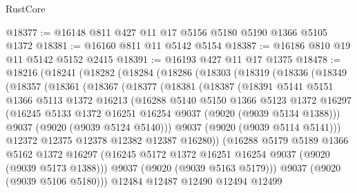 \begin{lexlean}{RustCore}
\begin{coremodule}
@18377 := @16148 @811 @427 @11 @17 @5156 @5180 @5190 @1366 @5105 @1372
@18381 := @16160 @811 @11 @5142 @5154
@18387 := @16186 @810 @19 @11 @5142 @5152 @2415
@18391 := @16193 @427 @11 @17 @1375
@18478 := @18216
    (@18241
      (@18282
        (@18284
          (@18286
            (@18303
              (@18319
                (@18336
                  (@18349
                    (@18357
                      (@18361
                        (@18367
                          (@18377
                            (@18381
                              (@18387
                                (@18391
                                  @5141
                                  @5151
                                  @1366
                                  @5113
                                  @1372
                                  @16213
                                  (@16288
                                    @5140
                                    @5150
                                    @1366
                                    @5123
                                    @1372
                                    @16297
                                    (@16245
                                      @5133
                                      @1372
                                      @16251
                                      @16254
                                      @9037
                                      (@9020 (@9039 @5134 @1388)))
                                    @9037
                                    (@9020 (@9039 @5124 @5140)))
                                  @9037
                                  (@9020 (@9039 @5114 @5141)))
                                @12372
                                @12375
                                @12378
                                @12382
                                @12387
                                @16280))
                            (@16288
                              @5179
                              @5189
                              @1366
                              @5162
                              @1372
                              @16297
                              (@16245 @5172 @1372 @16251 @16254 @9037 (@9020 (@9039 @5173 @1388)))
                              @9037
                              (@9020 (@9039 @5163 @5179)))
                            @9037
                            (@9020 (@9039 @5106 @5180)))
                          @12484
                          @12487
                          @12490
                          @12494
                          @12499

\end{coremodule}
\end{lexlean}
